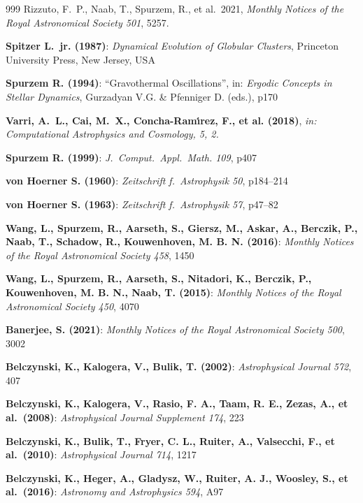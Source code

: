 \begin{thebibliography}{999}
 Rizzuto, F.~P., Naab, T., Spurzem, R., et al.\ 2021, \textit{Monthly Notices of the Royal Astronomical Society 501}, 5257.

\textbf{Spitzer L.~jr. (1987)}:
    \textit{Dynamical Evolution of Globular Clusters},
    Princeton University Press, New Jersey, USA


\textbf{Spurzem R. (1994)}:
    ``Gravothermal Oscillations'', in:
    \textit{Ergodic Concepts in Stellar Dynamics},
     Gurzadyan V.G. \& Pfenniger D. (eds.), p170

 \textbf{Varri, A.~L., Cai, M.~X., Concha-Ram{\'\i}rez, F., et al. (2018)}, \textit{in: Computational Astrophysics and Cosmology, 5, 2.}

\textbf{Spurzem R. (1999)}:
    \textit{J.\ Comput.\ Appl.\ Math. 109},
     p407


\textbf{von Hoerner S. (1960)}:
    \textit{Zeitschrift f.\ Astrophysik 50}, p184--214

\textbf{von Hoerner S. (1963)}:
    \textit{Zeitschrift f.\ Astrophysik 57}, p47--82

\textbf{Wang, L., Spurzem, R., Aarseth, S., Giersz, M., Askar, A., Berczik, P., Naab, T., Schadow, R., Kouwenhoven, M. B. N. (2016)}:     \textit{Monthly Notices of the Royal Astronomical Society 458}, 1450

\textbf{Wang, L., Spurzem, R., Aarseth, S., Nitadori, K., Berczik, P., Kouwenhoven, M. B. N., Naab, T. (2015)}:     \textit{Monthly Notices of the Royal Astronomical Society 450}, 4070

\textbf{Banerjee, S. (2021)}:     \textit{Monthly Notices of the Royal Astronomical Society 500}, 3002

\textbf{Belczynski, K., Kalogera, V., Bulik, T. (2002)}:     \textit{Astrophysical Journal 572}, 407

\textbf{Belczynski, K., Kalogera, V., Rasio, F. A., Taam, R. E., Zezas, A., et al.\ (2008)}:     \textit{Astrophysical Journal Supplement 174}, 223

\textbf{Belczynski, K., Bulik, T., Fryer, C. L., Ruiter, A., Valsecchi, F., et al.\ (2010)}:     \textit{Astrophysical Journal 714}, 1217

\textbf{Belczynski, K., Heger, A., Gladysz, W., Ruiter, A. J., Woosley, S., et al.\ (2016)}:     \textit{Astronomy and Astrophysics 594}, A97


\end{thebibliography}

